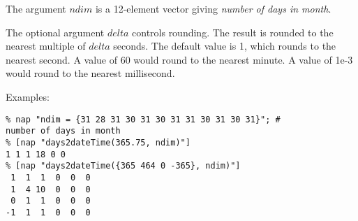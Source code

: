 The argument 
      $ndim$ is a 12-element vector giving 
      \emph{number of days in month}.
      

The optional argument 
      $delta$ controls rounding. The result is rounded to the
      nearest multiple of 
      $delta$ seconds. The default value is 1, which rounds to
      the nearest second. A value of 60 would round to the nearest
      minute. A value of 1e-3 would round to the nearest
      millisecond.
      

Examples:
      \begin{verbatim}
% nap "ndim = {31 28 31 30 31 30 31 31 30 31 30 31}"; #
number of days in month
% [nap "days2dateTime(365.75, ndim)"]
1 1 1 18 0 0
% [nap "days2dateTime({365 464 0 -365}, ndim)"]
 1  1  1  0  0  0
 1  4 10  0  0  0
 0  1  1  0  0  0
-1  1  1  0  0  0
\end{verbatim}

